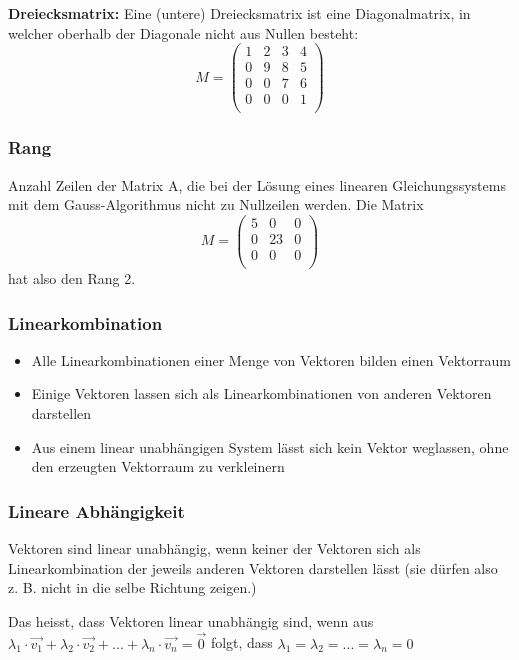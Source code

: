 \textbf{Dreiecksmatrix:} Eine (untere) Dreiecksmatrix ist eine Diagonalmatrix,
in welcher oberhalb der Diagonale nicht aus Nullen besteht:
\[ M = \begin {pmatrix}
 1  & 2  & 3  & 4 \\
 0  & 9  & 8  & 5 \\
 0  & 0  & 7  & 6 \\
 0  & 0  & 0  & 1 \\
\end {pmatrix} \]

\subsubsection{Rang}
Anzahl Zeilen der Matrix A, die bei der Lösung eines linearen
Gleichungssystems mit dem Gauss-Algorithmus nicht zu Nullzeilen werden.
Die Matrix
\[ M = \begin {pmatrix}
 5  & 0  & 0 \\
 0  & 23  & 0 \\
 0  & 0  & 0 \\
\end {pmatrix} \]
hat also den Rang 2.

\subsubsection{Linearkombination}
\begin{itemize}
  \item Alle Linearkombinationen einer Menge von Vektoren bilden einen
  Vektorraum
  \item Einige Vektoren lassen sich als Linearkombinationen von anderen
  Vektoren darstellen
  \item Aus einem linear unabhängigen System lässt sich kein Vektor
  weglassen, ohne den erzeugten Vektorraum zu verkleinern
\end{itemize}

\subsubsection{Lineare Abhängigkeit}
Vektoren sind linear unabhängig, wenn keiner der Vektoren sich
als Linearkombination der jeweils anderen Vektoren darstellen lässt
(sie dürfen also z. B. nicht in die selbe Richtung zeigen.)

Das heisst, dass Vektoren linear unabhängig sind, wenn aus $\lambda_1 \cdot \vec{v_1} +
\lambda_2 \cdot \vec{v_2} + ... + \lambda_n \cdot \vec{v_n} = \vec{0}$
folgt, dass $\lambda_1 = \lambda_2 = ... = \lambda_n = 0$


